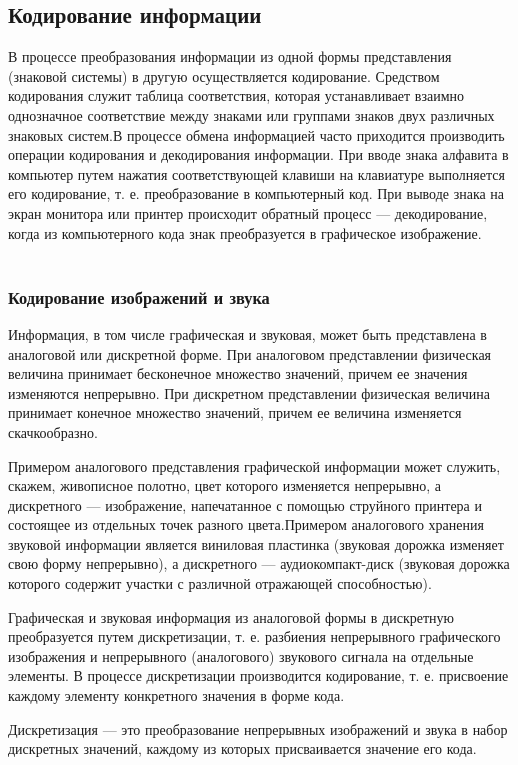 \documentclass[a4paper]{article}
\begin{document}
\subsection{Кодирование информации}
 В процессе преобразования информации из одной формы представления (знаковой системы) в другую осуществляется кодирование. Средством кодирования служит таблица соответствия, которая устанавливает взаимно однозначное соответствие между знаками или группами знаков двух различных знаковых систем.В процессе обмена информацией часто приходится производить операции кодирования и декодирования информации. При вводе знака алфавита в компьютер путем нажатия соответствующей клавиши на клавиатуре выполняется его кодирование, т. е. преобразование в компьютерный код. При выводе знака на экран монитора или принтер происходит обратный процесс — декодирование, когда из компьютерного кода знак преобразуется в графическое изображение.
     
 \subsubsection{Кодирование изображений и звука}
 Информация, в том числе графическая и звуковая, может быть представлена в аналоговой или дискретной форме. При аналоговом представлении физическая величина принимает бесконечное множество значений, причем ее значения изменяются непрерывно. При дискретном представлении физическая величина принимает конечное множество значений, причем ее величина изменяется скачкообразно.

 Примером аналогового представления графической информации может служить, скажем, живописное полотно, цвет которого изменяется непрерывно, а дискретного — изображение, напечатанное с помощью струйного принтера и состоящее из отдельных точек разного цвета.Примером аналогового хранения звуковой информации является виниловая пластинка (звуковая дорожка изменяет свою форму непрерывно), а дискретного — аудиокомпакт-диск (звуковая дорожка которого содержит участки с различной отражающей способностью).
 
 Графическая и звуковая информация из аналоговой формы в дискретную преобразуется путем дискретизации, т. е. разбиения непрерывного графического изображения и непрерывного (аналогового) звукового сигнала на отдельные элементы. В процессе дискретизации производится кодирование, т. е. присвоение каждому элементу конкретного значения в форме кода.
 
 Дискретизация — это преобразование непрерывных изображений и звука в набор дискретных значений, каждому из которых присваивается значение его кода.
 
\end{document}
